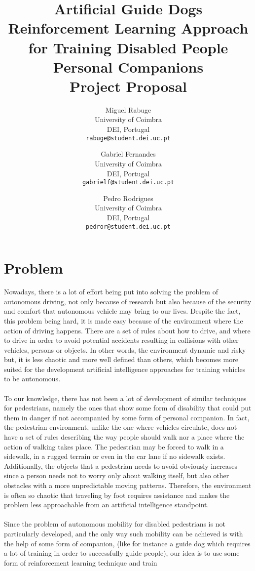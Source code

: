 \documentclass[letterpaper,10pt]{article}
\title{
  \textbf{Artificial Guide Dogs} \\\vspace{2pt}
  \large{Reinforcement Learning Approach for Training Disabled People 
  Personal Companions} \\\vspace{2pt}
  \Large{Project Proposal} 
}
\author{
  Miguel Rabuge\\
  University of Coimbra\\
  DEI, Portugal \\
  \texttt{rabuge@student.dei.uc.pt}
  \and
  Gabriel Fernandes\\
  University of Coimbra\\
  DEI, Portugal\\
  \texttt{gabrielf@student.dei.uc.pt}
  \and
  Pedro Rodrigues\\
  University of Coimbra\\
  DEI, Portugal \\
  \texttt{pedror@student.dei.uc.pt}
}
\begin{document}
\maketitle
\tableofcontents

\section{Problem}

Nowadays, there is a lot of effort being put into solving the problem of 
autonomous driving, not only because of research but also because of the 
security and comfort that autonomous vehicle may bring to our lives. Despite 
the fact, this problem being hard, it is made easy because of the environment
where the action of driving happens. There are a set of rules about how 
to drive, and where to drive in order to avoid potential accidents resulting 
in collisions with other vehicles, persons or objects. In other words, the 
environment dynamic and risky but, it is less chaotic and more well defined 
than others, which becomes more suited for the development artificial 
intelligence approaches for training vehicles to be autonomous.
\\\\
To our knowledge, there has not been a lot of development of similar
techniques for pedestrians, namely the ones that show some form of 
disability that could put them in danger if not accompanied by some form 
of personal companion. In fact, the pedestrian environment, unlike the
one where vehicles circulate, does not have a set of rules describing the 
way people should walk nor a place where the action of walking takes place.
The pedestrian may be forced to walk in a sidewalk, in a rugged terrain or 
even in the car lane if no sidewalk exists. Additionally, the objects that 
a pedestrian needs to avoid obviously increases since a person needs not to
worry only about walking itself, but also other obstacles with a more
unpredictable moving patterns. Therefore, the environment is often so chaotic 
that traveling by foot requires assistance and makes the problem less 
approachable from an artificial intelligence standpoint.
\\\\
Since the problem of autonomous mobility for disabled pedestrians is not
particularly developed, and the only way such mobility can be achieved is
with the help of some form of companion, (like for instance a guide dog
which requires a lot of training in order to successfully guide people), 
our idea is to use some form of reinforcement learning technique and train 
\end{document}
